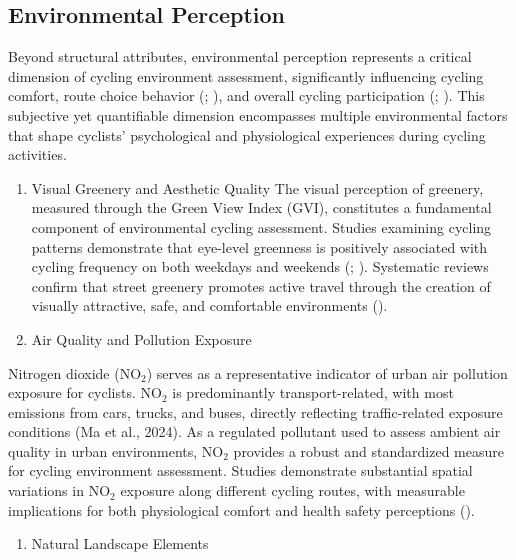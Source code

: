 \documentclass[
  12pt,
  oneside]{book}
\providecommand{\tightlist}{%
  \setlength{\itemsep}{0pt}\setlength{\parskip}{0pt}}
\begin{document}
\subsection{Environmental Perception}\label{environmental-perception}

Beyond structural attributes, environmental perception represents a critical dimension of cycling environment assessment, significantly influencing cycling comfort, route choice behavior (\textcite{broach_where_2012}; \textcite{sener_analysis_2009}), and overall cycling participation (\textcite{winters_motivators_2011}; \textcite{aldred_investigating_2015}). This subjective yet quantifiable dimension encompasses multiple environmental factors that shape cyclists' psychological and physiological experiences during cycling activities.

\begin{enumerate}
\def\labelenumi{\arabic{enumi}.}
\item
  Visual Greenery and Aesthetic Quality
  The visual perception of greenery, measured through the Green View Index (GVI), constitutes a fundamental component of environmental cycling assessment. Studies examining cycling patterns demonstrate that eye-level greenness is positively associated with cycling frequency on both weekdays and weekends (\textcite{lu_effect_2018}; \textcite{bai_exploring_2023}). Systematic reviews confirm that street greenery promotes active travel through the creation of visually attractive, safe, and comfortable environments (\textcite{nieuwenhuijsen_fifty_2017}).
\item
  Air Quality and Pollution Exposure
\end{enumerate}

Nitrogen dioxide (NO\(_2\)) serves as a representative indicator of urban air pollution exposure for cyclists. NO\(_2\) is predominantly transport-related, with most emissions from cars, trucks, and buses, directly reflecting traffic-related exposure conditions (Ma et al., 2024). As a regulated pollutant used to assess ambient air quality in urban environments, NO\(_2\) provides a robust and standardized measure for cycling environment assessment. Studies demonstrate substantial spatial variations in NO\(_2\) exposure along different cycling routes, with measurable implications for both physiological comfort and health safety perceptions (\textcite{an_impact_2018}).

\begin{enumerate}
\def\labelenumi{\arabic{enumi}.}
\setcounter{enumi}{2}
\tightlist
\item
  Natural Landscape Elements
\end{enumerate}
\end{document}
